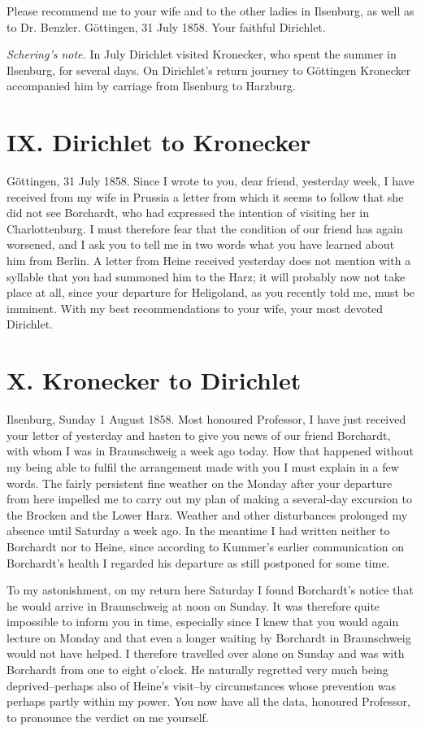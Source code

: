 \documentclass[11pt]{article}
\begin{document}
Please recommend me to your wife and to the other ladies in Ilsenburg, as well as to Dr. Benzler. Göttingen, 31 July 1858. Your faithful Dirichlet.

\medskip
\noindent\emph{Schering's note.} In July Dirichlet visited Kronecker, who spent the summer in Ilsenburg, for several days. On Dirichlet's return journey to Göttingen Kronecker accompanied him by carriage from Ilsenburg to Harzburg.

\section*{IX. Dirichlet to Kronecker}
Göttingen, 31 July 1858. Since I wrote to you, dear friend, yesterday week, I have received from my wife in Prussia a letter from which it seems to follow that she did not see Borchardt, who had expressed the intention of visiting her in Charlottenburg. I must therefore fear that the condition of our friend has again worsened, and I ask you to tell me in two words what you have learned about him from Berlin. A letter from Heine received yesterday does not mention with a syllable that you had summoned him to the Harz; it will probably now not take place at all, since your departure for Heligoland, as you recently told me, must be imminent. With my best recommendations to your wife, your most devoted Dirichlet.

\section*{X. Kronecker to Dirichlet}
Ilsenburg, Sunday 1 August 1858. Most honoured Professor, I have just received your letter of yesterday and hasten to give you news of our friend Borchardt, with whom I was in Braunschweig a week ago today. How that happened without my being able to fulfil the arrangement made with you I must explain in a few words. The fairly persistent fine weather on the Monday after your departure from here impelled me to carry out my plan of making a several-day excursion to the Brocken and the Lower Harz. Weather and other disturbances prolonged my absence until Saturday a week ago. In the meantime I had written neither to Borchardt nor to Heine, since according to Kummer's earlier communication on Borchardt's health I regarded his departure as still postponed for some time.

To my astonishment, on my return here Saturday I found Borchardt's notice that he would arrive in Braunschweig at noon on Sunday. It was therefore quite impossible to inform you in time, especially since I knew that you would again lecture on Monday and that even a longer waiting by Borchardt in Braunschweig would not have helped. I therefore travelled over alone on Sunday and was with Borchardt from one to eight o'clock. He naturally regretted very much being deprived--perhaps also of Heine's visit--by circumstances whose prevention was perhaps partly within my power. You now have all the data, honoured Professor, to pronounce the verdict on me yourself.
\end{document}
